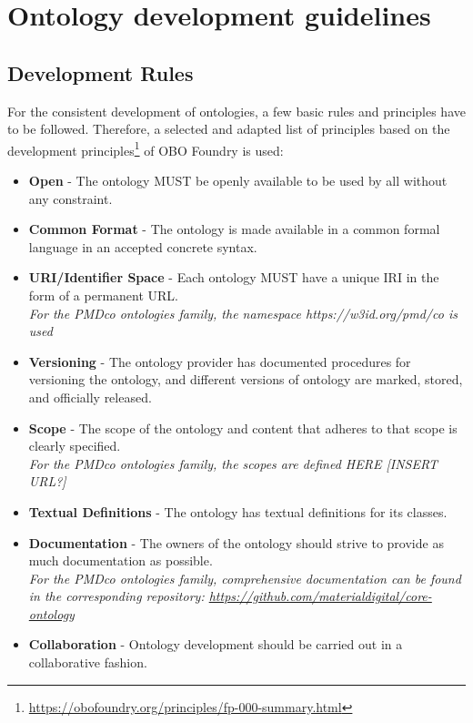 
\section{Ontology development guidelines}

\subsection{Development Rules}
\label{ssec:development-rules}
For the consistent development of ontologies, a few basic rules and principles have to be followed.
Therefore, a selected and adapted list of principles based on the development principles\footnote{\url{https://obofoundry.org/principles/fp-000-summary.html}} of OBO Foundry\cite{smith2007obo} is used:

\begin{itemize}
    \item \textbf{Open} - The ontology MUST be openly available to be used by all without any constraint.
    \item \textbf{Common Format} - The ontology is made available in a common formal language in an accepted concrete syntax.
    \item \textbf{URI/Identifier Space} - Each ontology MUST have a unique IRI in the form of a permanent URL. \\ \textit{For the PMDco ontologies family, the namespace https://w3id.org/pmd/co is used}
    \item \textbf{Versioning} - The ontology provider has documented procedures for versioning the ontology, and different versions of ontology are marked, stored, and officially released.
    \item \textbf{Scope} - The scope of the ontology and content that adheres to that scope is clearly specified. \\ \textit{For the PMDco ontologies family, the scopes are defined HERE [INSERT URL?]}
    \item \textbf{Textual Definitions} - The ontology has textual definitions for its classes.
    \item \textbf{Documentation} - The owners of the ontology should strive to provide as much documentation as possible. \\ \textit{For the PMDco ontologies family, comprehensive documentation can be found in the corresponding {\github}  repository: \url{https://github.com/materialdigital/core-ontology}}
    \item \textbf{Collaboration} - Ontology development should be carried out in a collaborative fashion.

\end{itemize}
